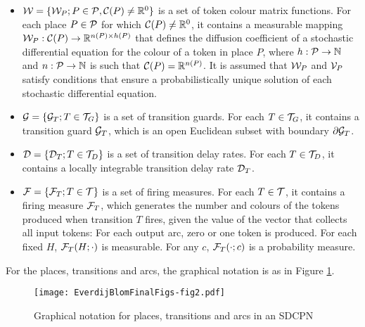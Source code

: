 \documentclass[copyright,creativecommons]{eptcs}
\begin{document}
\begin{itemize}
\item ${\cal W} = \{{\cal W}_P ; P \in {\cal P}, {\cal C}(P)
      \neq \mathbb{R}^0\}$ is a set of token colour matrix functions.
      For each place $P\in {\cal P}$ for which ${\cal C}(P)\neq
      \mathbb{R}^0$, it contains a measurable mapping
      ${\cal W}_P : {\cal C}(P) \to \mathbb{R}^{n(P)\times h(P)}$
      that defines the diffusion coefficient of a stochastic
      differential equation for the colour of a token in place $P$,
      where $h : {\cal P} \rightarrow \mathbb{N}$ and $n : {\cal P}
      \rightarrow \mathbb{N}$ is such that ${\cal C}(P) = \mathbb{R}^{n(P)}$.
      It is assumed
      that ${\cal W}_P$ and ${\cal V}_P$ satisfy
      conditions that ensure a probabilistically unique solution of
      each stochastic differential equation.

\item ${\cal G}  = \{{\cal G}_T ; T \in {\cal T}_G\}$ is a set of
      transition guards. For each $T \in {\cal
      T}_G$, it contains a transition guard ${\cal G}_T$, which is an open
      Euclidean subset with boundary $\partial {\cal G}_T$.

\item ${\cal D} = \{{\cal D}_T ; T \in {\cal T}_D\}$ is a set of
      transition delay rates. For each $T \in {\cal T}_D$, it contains
      a locally integrable transition delay rate ${\cal D}_T$.

\item ${\cal F} = \{{\cal F}_T ; T \in {\cal T}\}$ is a set of firing
      measures. For each $T \in {\cal T}$,
      it contains a firing measure ${\cal F}_T$, which
      generates the number and colours of the tokens produced when
      transition $T$ fires, given the value of the vector
      that collects all input tokens:
      For each output arc, zero or one token is
      produced.
      For each fixed $H$, ${\cal F}_T(H;\cdot)$
      is measurable. For any $c$, ${\cal F}_T(\cdot;c)$ is a probability
      measure.

\end{itemize}
For the places, transitions and arcs, the graphical notation is as
in Figure \ref{fig:graphPTA}.

\begin{figure}[h!bt]
\begin{center}
\texttt{[image: EverdijBlomFinalFigs-fig2.pdf]}
\end{center}
\caption{Graphical notation for places, transitions and arcs in an SDCPN}
\label{fig:graphPTA}
\end{figure}
\end{document}

